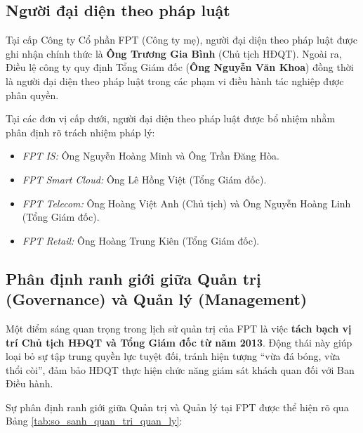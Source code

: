 \subsection{Người đại diện theo pháp luật}
Tại cấp Công ty Cổ phần FPT (Công ty mẹ), người đại diện theo pháp luật được ghi nhận chính thức là \textbf{Ông Trương Gia Bình} (Chủ tịch HĐQT). Ngoài ra, Điều lệ công ty quy định Tổng Giám đốc (\textbf{Ông Nguyễn Văn Khoa}) đồng thời là người đại diện theo pháp luật trong các phạm vi điều hành tác nghiệp được phân quyền.

Tại các đơn vị cấp dưới, người đại diện theo pháp luật được bổ nhiệm nhằm phân định rõ trách nhiệm pháp lý:
\begin{itemize}[noitemsep]
    \item \textit{FPT IS:} Ông Nguyễn Hoàng Minh và Ông Trần Đăng Hòa.
    \item \textit{FPT Smart Cloud:} Ông Lê Hồng Việt (Tổng Giám đốc).
    \item \textit{FPT Telecom:} Ông Hoàng Việt Anh (Chủ tịch) và Ông Nguyễn Hoàng Linh (Tổng Giám đốc).
    \item \textit{FPT Retail:} Ông Hoàng Trung Kiên (Tổng Giám đốc).
\end{itemize}

\subsection{Phân định ranh giới giữa Quản trị (Governance) và Quản lý (Management)}
Một điểm sáng quan trọng trong lịch sử quản trị của FPT là việc \textbf{tách bạch vị trí Chủ tịch HĐQT và Tổng Giám đốc từ năm 2013}. Động thái này giúp loại bỏ sự tập trung quyền lực tuyệt đối, tránh hiện tượng ``vừa đá bóng, vừa thổi còi'', đảm bảo HĐQT thực hiện chức năng giám sát khách quan đối với Ban Điều hành.

Sự phân định ranh giới giữa Quản trị và Quản lý tại FPT được thể hiện rõ qua Bảng \ref{tab:so_sanh_quan_tri_quan_ly}:

